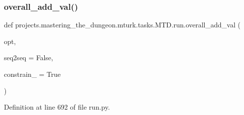 \subsubsection{\texorpdfstring{overall\+\_\+add\+\_\+val()}{overall\_add\_val()}}
{\footnotesize\ttfamily def projects.\+mastering\+\_\+the\+\_\+dungeon.\+mturk.\+tasks.\+M\+T\+D.\+run.\+overall\+\_\+add\+\_\+val (\begin{DoxyParamCaption}\item[{}]{opt,  }\item[{}]{seq2seq = {\ttfamily False},  }\item[{}]{constrain\+\_\+ = {\ttfamily True} }\end{DoxyParamCaption})}



Definition at line 692 of file run.\+py.


